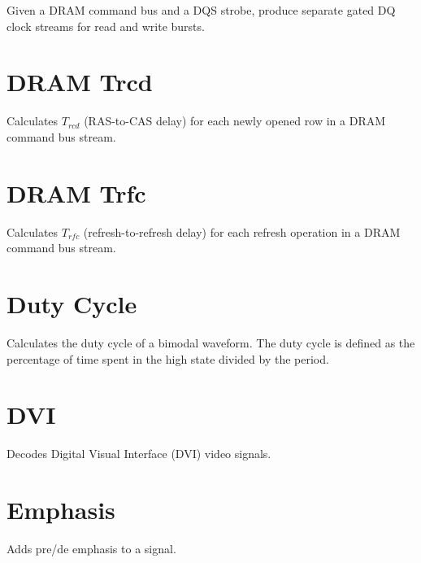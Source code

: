 Given a DRAM command bus and a DQS strobe, produce separate gated DQ clock streams for read and write bursts.

\pagebreak
\section{DRAM Trcd}

Calculates $T_{rcd}$ (RAS-to-CAS delay) for each newly opened row in a DRAM command bus stream.

\pagebreak
\section{DRAM Trfc}

Calculates $T_{rfc}$ (refresh-to-refresh delay) for each refresh operation in a DRAM command bus stream.

\pagebreak
\section{Duty Cycle}

Calculates the duty cycle of a bimodal waveform. The duty cycle is defined as the percentage of time spent in the high
state divided by the period.

\pagebreak
\section{DVI}
\label{filter:dvi}

Decodes Digital Visual Interface (DVI) video signals.

\pagebreak
\section{Emphasis}

Adds pre/de emphasis to a signal.

\pagebreak

